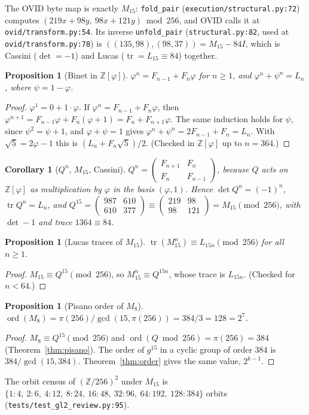 \documentclass[11pt]{article}
\newtheorem{proposition}[theorem]{Proposition}
\newtheorem{corollary}[theorem]{Corollary}
\theoremstyle{definition}
\newcommand{\Z}{\mathbb{Z}}
\newcommand{\tr}{\operatorname{tr}}
\newcommand{\code}[1]{\texttt{\small #1}}
\begin{document}
The OVID byte map is exactly $M_{15}$: \code{fold\_pair} (\code{execution/structural.py:72}) computes
$(219x+98y,\ 98x+121y)\bmod256$, and OVID calls it at \code{ovid/transform.py:54}. Its inverse \code{unfold\_pair}
(\code{structural.py:82}, used at \code{ovid/transform.py:78}) is $((135,98),(98,37))=M_{15}-84I$, which is Cassini
($\det=-1$) and Lucas ($\tr=L_{15}\equiv84$) together.

\begin{proposition}[{Binet in $\Z[\varphi]$}]\label{prop:binet}
$\varphi^n=F_{n-1}+F_n\varphi$ for $n\ge1$, and $\varphi^n+\psi^n=L_n$, where $\psi=1-\varphi$.
\end{proposition}
\begin{proof}
$\varphi^1=0+1\cdot\varphi$. If $\varphi^n=F_{n-1}+F_n\varphi$, then
$\varphi^{n+1}=F_{n-1}\varphi+F_n(\varphi+1)=F_n+F_{n+1}\varphi$. The same induction holds for $\psi$, since
$\psi^2=\psi+1$, and $\varphi+\psi=1$ gives $\varphi^n+\psi^n=2F_{n-1}+F_n=L_n$. With $\sqrt5=2\varphi-1$ this is
$(L_n+F_n\sqrt5)/2$. (Checked in $\Z[\varphi]$ up to $n=364$.)
\end{proof}

\begin{corollary}[$Q^n$, $M_{15}$, Cassini]
$Q^n=\begin{pmatrix}F_{n+1}&F_n\\F_n&F_{n-1}\end{pmatrix}$, because $Q$ acts on $\Z[\varphi]$ as multiplication by
$\varphi$ in the basis $(\varphi,1)$. Hence $\det Q^n=(-1)^n$, $\tr Q^n=L_n$, and
$Q^{15}=\begin{pmatrix}987&610\\610&377\end{pmatrix}\equiv\begin{pmatrix}219&98\\98&121\end{pmatrix}=M_{15}\pmod{256}$,
with $\det -1$ and trace $1364\equiv84$.
\end{corollary}

\begin{proposition}[Lucas traces of $M_{15}$]
$\tr(M_{15}^n)\equiv L_{15n}\pmod{256}$ for all $n\ge1$.
\end{proposition}
\begin{proof}
$M_{15}\equiv Q^{15}\pmod{256}$, so $M_{15}^n\equiv Q^{15n}$, whose trace is $L_{15n}$. (Checked for $n<64$.)
\end{proof}

\begin{proposition}[Pisano order of $M_8$]
$\operatorname{ord}(M_8)=\pi(256)/\gcd(15,\pi(256))=384/3=128=2^7$.
\end{proposition}
\begin{proof}
$M_8\equiv Q^{15}\pmod{256}$ and $\operatorname{ord}(Q\bmod256)=\pi(256)=384$ (Theorem~\ref{thm:pisano}). The order
of $g^{15}$ in a cyclic group of order 384 is $384/\gcd(15,384)$. Theorem~\ref{thm:order} gives the same value,
$2^{k-1}$.
\end{proof}
The orbit census of $(\Z/256)^2$ under $M_{15}$ is $\{1{:}4,\ 2{:}6,\ 4{:}12,\ 8{:}24,\ 16{:}48,\ 32{:}96,\
64{:}192,\ 128{:}384\}$ orbits (\code{tests/test\_gl2\_review.py:95}).
\end{document}
